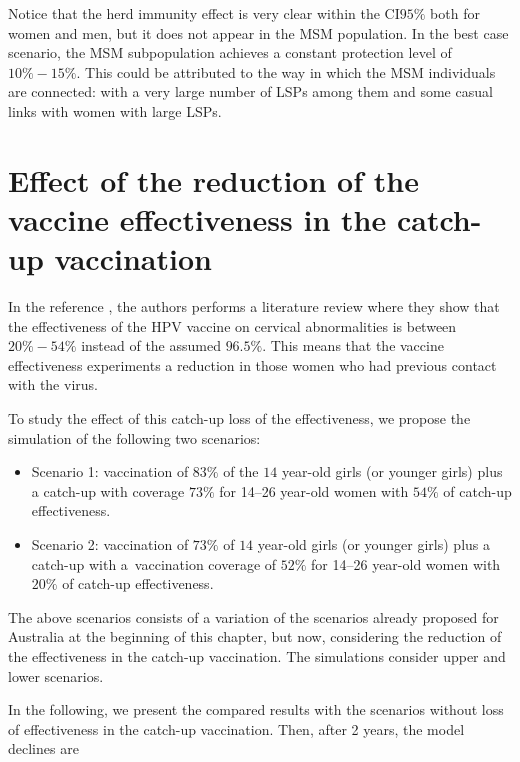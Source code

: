 Notice that the herd immunity effect is very clear within the CI$95\%$ both for women and men, but it does not appear in the MSM population. In the best case scenario, the MSM subpopulation achieves a constant protection level of $10\%-15\%$. This could be attributed to the way in which the MSM individuals are connected: with a very large number of LSPs among them and some casual links with women with large LSPs.

\section{Effect of the reduction of the vaccine effectiveness in the catch-up vaccination}\label{sec:australia_sfuka}
In the reference \cite{Skufca}, the authors performs a literature review where they show that the effectiveness of the HPV vaccine on cervical abnormalities is between $20\%-54\%$ instead of the assumed $96.5\%$. This means that the vaccine effectiveness experiments a reduction in those women who had previous contact with the virus.

To study the effect of this catch-up loss of the effectiveness, we propose the simulation of the following two scenarios: 

\begin{itemize}
	\item Scenario 1: vaccination of $83\%$ of the $14$ year-old girls (or younger girls) plus a catch-up with coverage $73\%$ for 14--26 year-old women with $54\%$ of catch-up effectiveness.
	\item Scenario 2: vaccination of $73\%$ of $14$ year-old girls (or younger girls) plus a catch-up with a~vaccination coverage of $52\%$ for 14--26 year-old women with $20\%$ of catch-up effectiveness.
\end{itemize}

The above scenarios consists of a variation of the scenarios already proposed  for Australia at the beginning of this chapter, but now, considering the reduction of the effectiveness in the catch-up vaccination. The simulations consider upper and lower scenarios. 

In the following, we present the compared results with the scenarios without loss of effectiveness in the catch-up vaccination. Then, after 2 years, the model declines are

